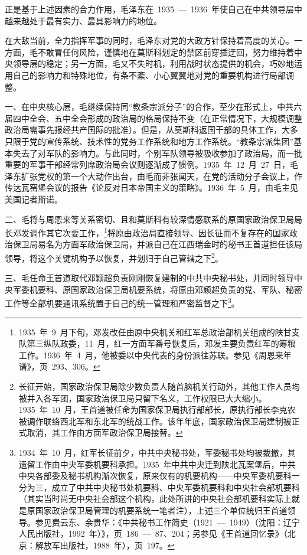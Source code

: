 正是基于上述因素的合力作用，毛泽东在~1935~—~1936~年使自己在中共领导层中越来越处于最有实力、最具影响力的地位。

在大敌当前，全力指挥军事的同时，毛泽东对党的大政方针保持着高度的关心。一方面，毛不敢冒任何风险，谨慎地在莫斯科划定的禁区前穿插迂回，努力维持着中央领导层的稳定；另一方面，毛又不失时机，利用战时状态提供的机会，巧妙地运用自己的影响力和特殊地位，有条不紊、小心翼翼地对党的重要机构进行局部调整。

一、在中央核心层，毛继续保持同“教条宗派分子”的合作，至少在形式上，中共六届四中全会、五中全会形成的政治局的格局保持不变（在正常情况下，大规模调整政治局需事先报经共产国际的批准）。但是，从莫斯科返国干部的具体工作，大多只限于党的宣传系统、技术性的党务工作系统和地方工作系统。“教条宗派集团”基本失去了对军队的影响力。与此同时，个别军队领导被吸收参加了政治局，而一批重要的军事干部经常列席政治局会议则逐渐成了惯例。1935~年~12~月~27~日，毛泽东扩张党权的第一个大动作出台，由毛而非张闻天，在党的活动分子会议上，作传达瓦窑堡会议的报告《论反对日本帝国主义的策略》。1936~年~5~月，由毛主见美国记者斯诺。

二、毛将与周恩来等关系密切、且和莫斯科有较深情感联系的原国家政治保卫局局长邓发调作其它次要工作，\footnote{1935~年~9~月下旬，邓发改任由原中央机关和红军总政治部机关组成的陕甘支队第三纵队政委，11~月，红一方面军番号恢复后，邓发主要负责红军的筹粮工作。1936~年~4~月，他被委以中央代表的身份派往苏联。参见《周恩来年谱》，页~293、306。}将原由政治局直接领导、因长征而不复存在的国家政治保卫局易名为方面军政治保卫局，并派自己在江西瑞金时的秘书王首道担任该局领导，将这个关键机构予以恢复，并划归于自己管辖之下\footnote{长征开始，国家政治保卫局除少数负责人随首脑机关行动外，其他工作人员均被并入各军团，国家政治保卫局只留下名义，工作权限已大大缩小。1935~年~10~月，王首道被任命为国家保卫局执行部部长，原执行部长李克农被调作联络西北军和东北军的统战工作。该年年底，国家政治保卫局建制被正式取消，其工作由方面军政治保卫局接替。}。

三、毛任命王首道取代邓颖超负责刚刚恢复建制的中共中央秘书处，并同时领导中央军委机要科、原国家政治保卫局机要系统，将原由邓颖超负责的党、军队、秘密工作等全部机要通讯系统置于自己的统一管理和严密监督之下\footnote{1934~年~10~月，红军长征前夕，中共中央秘书处，军委秘书处均被裁撤，其遗留工作由中央军委机要科承担。1935~年中共中央迁到陕北瓦案堡后，中共中央各部委及秘书机构渐次恢复，原来仅有的机要机构——中央军委机要科一分为三，成立了中共中央秘书处机要科、中央军委机要科和中央社会部机要科（其实当时尚无中央社会部这个机构，此处所讲的中央社会部机要科实际上就是原国家政治保卫局管理的机要系统一笔者注），上述三个单位统归王首道领导。参见费云东、余贵华：《中共秘书工作简史（1921~—~1949）（沈阳：辽宁人民出版社，1992~年）》，页~186~—~87、204；另参见《王首道回忆录》（北京：解放军出版社，1988~年），页~197。}。

